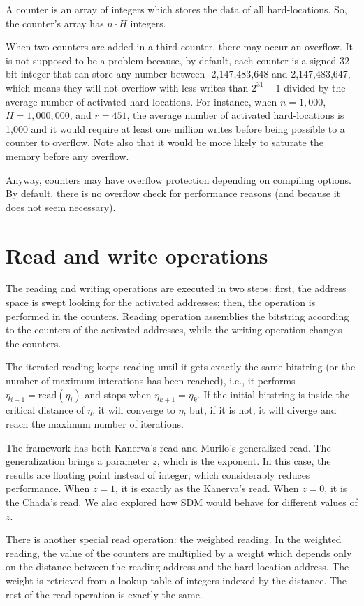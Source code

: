 A counter is an array of integers which stores the data of all hard-locations. So, the counter's array has $n \cdot H$ integers.

When two counters are added in a third counter, there may occur an overflow. It is not supposed to be a problem because, by default, each counter is a signed 32-bit integer that can store any number between -2,147,483,648 and 2,147,483,647, which means they will not overflow with less writes than $2^{31}-1$ divided by the average number of activated hard-locations. For instance, when $n=1,000$, $H=1,000,000$, and $r=451$, the average number of activated hard-locations is 1,000 and it would require at least one million writes before being possible to a counter to overflow.  Note also that it would be more likely to saturate the memory before any overflow.

Anyway, counters may have overflow protection depending on compiling options. By default, there is no overflow check for performance reasons (and because it does not seem necessary).

\section{Read and write operations}

The reading and writing operations are executed in two steps: first, the address space is swept looking for the activated addresses; then, the operation is performed in the counters. Reading operation assemblies the bitstring according to the counters of the activated addresses, while the writing operation changes the counters.

The iterated reading keeps reading until it gets exactly the same bitstring (or the number of maximum interations has been reached), i.e., it performs $\eta_{i+1} = \text{read}(\eta_i)$ and stops when $\eta_{k+1} = \eta_{k}$. If the initial bitstring is inside the critical distance of $\eta$, it will converge to $\eta$, but, if it is not, it will diverge and reach the maximum number of iterations.

The framework has both Kanerva's read and Murilo's generalized read. The generalization brings a parameter $z$, which is the exponent. In this case, the results are floating point instead of integer, which considerably reduces performance. When $z=1$, it is exactly as the Kanerva's read. When $z=0$, it is the Chada's read. We also explored how SDM would behave for different values of $z$.

There is another special read operation: the weighted reading. In the weighted reading, the value of the counters are multiplied by a weight which depends only on the distance between the reading address and the hard-location address. The weight is retrieved from a lookup table of integers indexed by the distance. The rest of the read operation is exactly the same.

